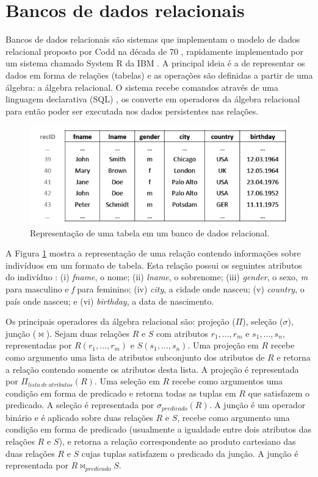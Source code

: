\section{Bancos de dados relacionais}
\label{sec:relacional}

Bancos de dados relacionais são sistemas que implementam o modelo de dados
relacional proposto por Codd na década de 70 \citep{Codd1970}, rapidamente
implementado por um sistema chamado System R da IBM \citep{Astrahan1976}.
A principal ideia é a de representar os dados em forma de relações (tabelas)
e as operações são definidas a partir de uma álgebra: a álgebra relacional.
O sistema recebe comandos através de uma linguagem declarativa (SQL) 
\citep{Chamberlin1974}, os converte em operadores da álgebra relacional
para então poder ser executada nos dados persistentes nas relações.

\begin{figure}[!htbp]
        \centering
        \includegraphics[width=0.8\linewidth]{./colunar_repr_tabela.png}
        \caption{Representação de uma tabela em um banco de dados relacional.}
        \label{fig:tabular}
\end{figure}

A Figura \ref{fig:tabular} mostra a representação de uma relação contendo 
informações sobre indivíduos em um formato de tabela. Esta relação possui
os seguintes atributos do indivíduo : (i) \emph{fname}, o nome; (ii) 
\emph{lname}, o sobrenome; (iii) \emph{gender}, o sexo, \emph{m} para 
masculino e \emph{f} para feminino; (iv) \emph{city},
a cidade onde nasceu; (v) \emph{country}, o país onde nasceu; e 
(vi) \emph{birthday}, a data de nascimento.

Os principais operadores da álgebra relacional são: projeção ($\Pi$),
seleção ($\sigma$), junção ($\bowtie$). Sejam duas relações $R$ e $S$
com atributos $r_1, \ldots, r_m$ e $s_1, \ldots, s_n$, representadas
por $R(r_1, \ldots, r_m)$ e $S(s_1, \ldots, s_n)$. Uma projeção em $R$
recebe como argumento uma lista de atributos subconjunto dos atributos
de $R$ e retorna a relação contendo somente os atributos desta lista.
A projeção é representada por $\Pi_{lista~de~atributos}(R)$. Uma seleção
em $R$ recebe como argumentos uma condição em forma de predicado e 
retorna todas as tuplas em $R$ que satisfazem o predicado. A seleção 
é representada por $\sigma_{predicado} (R)$. A junção é um operador
binário e é aplicado sobre duas relações $R$ e $S$, recebe como argumento
uma condição em forma de predicado (usualmente a igualdade entre dois
atributos das relações $R$ e $S$), e retorna a relação correspondente
ao produto cartesiano das duas relações $R$ e $S$ cujas tuplas satisfazem
o predicado da junção. A junção é representada por $R \bowtie_{predicado} S$. 

